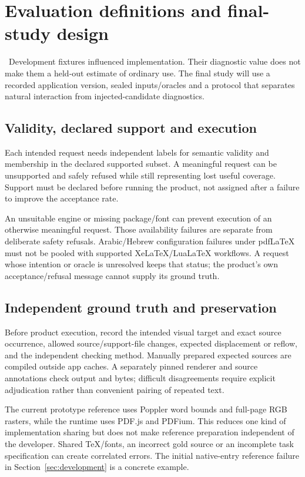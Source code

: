 \section{Evaluation definitions and final-study design}
\label{sec:evaluation}
\pending\ Development fixtures influenced implementation. Their diagnostic
value does not make them a held-out estimate of ordinary use. The final study
will use a recorded application version, sealed inputs/oracles and a protocol
that separates natural interaction from injected-candidate diagnostics.

\subsection{Validity, declared support and execution}
Each intended request needs independent labels for semantic validity and
membership in the declared supported subset. A meaningful request can be
unsupported and safely refused while still representing lost useful coverage.
Support must be declared before running the product, not assigned after a
failure to improve the acceptance rate.

An unsuitable engine or missing package/font can prevent execution of an
otherwise meaningful request. Those availability failures are separate from
deliberate safety refusals. Arabic/Hebrew configuration failures under
pdfLaTeX must not be pooled with supported XeLaTeX/LuaLaTeX workflows. A request
whose intention or oracle is unresolved keeps that status; the product's own
acceptance/refusal message cannot supply its ground truth.

\subsection{Independent ground truth and preservation}
Before product execution, record the intended visual target and exact source
occurrence, allowed source/support-file changes, expected displacement or
reflow, and the independent checking method. Manually prepared expected sources
are compiled outside app caches. A separately pinned renderer and source
annotations check output and bytes; difficult disagreements require explicit
adjudication rather than convenient pairing of repeated text.

The current prototype reference uses Poppler word bounds and full-page RGB
rasters, while the runtime uses PDF.js and PDFium. This reduces one kind of
implementation sharing but does not make reference preparation independent
of the developer. Shared TeX/fonts, an incorrect gold source or an incomplete
task specification can create correlated errors. The initial native-entry
reference failure in Section~\ref{sec:development} is a concrete example.

